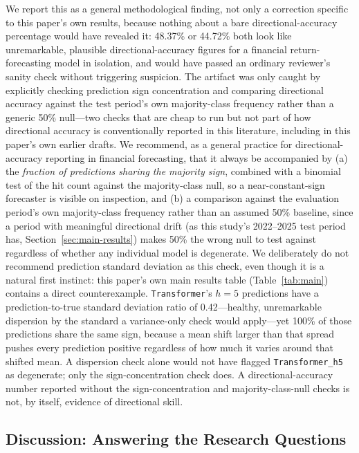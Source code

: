\documentclass[journal]{IEEEtran}
\begin{document}
We report this as a general methodological finding, not only a correction specific to this paper's own results, because nothing about a bare directional-accuracy percentage would have revealed it: 48.37\% or 44.72\% both look like unremarkable, plausible directional-accuracy figures for a financial return-forecasting model in isolation, and would have passed an ordinary reviewer's sanity check without triggering suspicion. The artifact was only caught by explicitly checking prediction sign concentration and comparing directional accuracy against the test period's own majority-class frequency rather than a generic 50\% null---two checks that are cheap to run but not part of how directional accuracy is conventionally reported in this literature, including in this paper's own earlier drafts. We recommend, as a general practice for directional-accuracy reporting in financial forecasting, that it always be accompanied by (a) the \emph{fraction of predictions sharing the majority sign}, combined with a binomial test of the hit count against the majority-class null, so a near-constant-sign forecaster is visible on inspection, and (b) a comparison against the evaluation period's own majority-class frequency rather than an assumed 50\% baseline, since a period with meaningful directional drift (as this study's 2022--2025 test period has, Section~\ref{sec:main-results}) makes 50\% the wrong null to test against regardless of whether any individual model is degenerate. We deliberately do not recommend prediction standard deviation as this check, even though it is a natural first instinct: this paper's own main results table (Table~\ref{tab:main}) contains a direct counterexample. \texttt{Transformer}'s $h=5$ predictions have a prediction-to-true standard deviation ratio of 0.42---healthy, unremarkable dispersion by the standard a variance-only check would apply---yet 100\% of those predictions share the same sign, because a mean shift larger than that spread pushes every prediction positive regardless of how much it varies around that shifted mean. A dispersion check alone would not have flagged \texttt{Transformer\_h5} as degenerate; only the sign-concentration check does. A directional-accuracy number reported without the sign-concentration and majority-class-null checks is not, by itself, evidence of directional skill.

\subsection{Discussion: Answering the Research Questions}
\label{sec:discussion}
\end{document}
